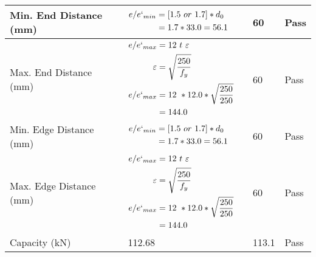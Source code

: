 \documentclass{article}%
\begin{document}
\begin{longtable}{|p{4cm}|p{5cm}|p{5.5cm}|p{1.5cm}|}
\hline%
Min. End Distance (mm)&$\begin{aligned}e/e`_{min} &=[1.5~or~ 1.7] * d_0\\ &=1.7*33.0=56.1 \end{aligned}$&60&Pass\\%
\hline%
Max. End Distance (mm)&$\begin{aligned}e/e`_{max} &= 12~ t~ \varepsilon&\\ \varepsilon &= \sqrt{\frac{250}{f_y}}\\ e/e`_{max}&=12 ~*12.0*\sqrt{\frac{250}{250}}\\ &=144.0\\ \end{aligned}$&60&Pass\\%
\hline%
Min. Edge Distance (mm)&$\begin{aligned}e/e`_{min} &=[1.5~or~ 1.7] * d_0\\ &=1.7*33.0=56.1 \end{aligned}$&60&Pass\\%
\hline%
Max. Edge Distance (mm)&$\begin{aligned}e/e`_{max} &= 12~ t~ \varepsilon&\\ \varepsilon &= \sqrt{\frac{250}{f_y}}\\ e/e`_{max}&=12 ~*12.0*\sqrt{\frac{250}{250}}\\ &=144.0\\ \end{aligned}$&60&Pass\\%
\hline%
Capacity (kN)&112.68&113.1&Pass\\%
\hline%
\end{longtable}

%
\newpage%
\end{document}
